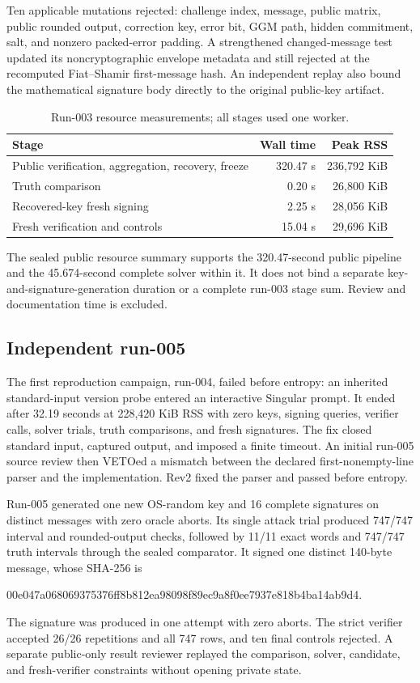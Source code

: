 \documentclass[10pt,a4paper]{article}
\begin{document}
Ten applicable mutations rejected: challenge index, message, public matrix,
public rounded output, correction key, error bit, GGM path, hidden commitment,
salt, and nonzero packed-error padding.  A strengthened changed-message test
updated its noncryptographic envelope metadata and still rejected at the
recomputed Fiat--Shamir first-message hash.  An independent replay also bound
the mathematical signature body directly to the original public-key artifact.

\begin{table}[t]
\centering
\caption{Run-003 resource measurements; all stages used one worker.}
\begin{tabular}{@{}lrr@{}}
\toprule
Stage & Wall time & Peak RSS \\
\midrule
Public verification, aggregation, recovery, freeze & 320.47 s & 236,792 KiB \\
Truth comparison & 0.20 s & 26,800 KiB \\
Recovered-key fresh signing & 2.25 s & 28,056 KiB \\
Fresh verification and controls & 15.04 s & 29,696 KiB \\
\bottomrule
\end{tabular}
\end{table}

The sealed public resource summary supports the 320.47-second public pipeline
and the 45.674-second complete solver within it.  It does not bind a separate
key-and-signature-generation duration or a complete run-003 stage sum.  Review
and documentation time is excluded.

\subsection{Independent run-005}

The first reproduction campaign, run-004, failed before entropy: an inherited
standard-input version probe entered an interactive Singular prompt.  It ended
after 32.19 seconds at 228,420 KiB RSS with zero keys, signing queries,
verifier calls, solver trials, truth comparisons, and fresh signatures.  The
fix closed standard input, captured output, and imposed a finite timeout.  An
initial run-005 source review then VETOed a mismatch between the declared
first-nonempty-line parser and the implementation.  Rev2 fixed the parser and
passed before entropy.

Run-005 generated one new OS-random key and 16 complete signatures on distinct
messages with zero oracle aborts.  Its single attack trial produced 747/747
interval and rounded-output checks, followed by 11/11 exact words and 747/747
truth intervals through the sealed comparator.  It signed one distinct
140-byte message, whose SHA-256 is
\begin{center}
\small\ttfamily 00e047a068069375376ff8b812ea98098f89ec9a8f0ee7937e818b4ba14ab9d4.
\end{center}
The signature was produced in one attempt with zero aborts.  The strict
verifier accepted 26/26 repetitions and all 747 rows, and ten final controls
rejected.  A separate public-only result reviewer replayed the comparison,
solver, candidate, and fresh-verifier constraints without opening private
state.
\end{document}
